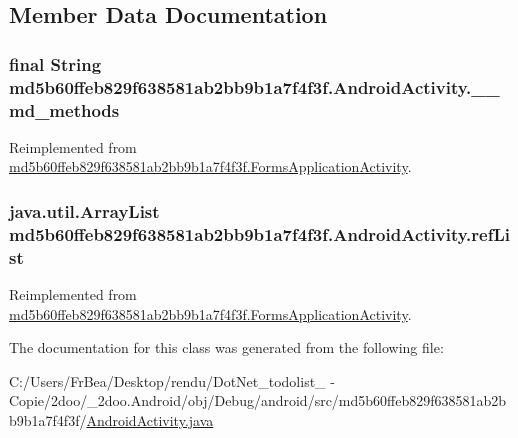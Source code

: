 \subsection{Member Data Documentation}
\hypertarget{classmd5b60ffeb829f638581ab2bb9b1a7f4f3f_1_1_android_activity_96cef65bd666995b23bcd03497dea337}{
\subsubsection[{\_\-\_\-md\_\-methods}]{\setlength{\rightskip}{0pt plus 5cm}final String {\bf md5b60ffeb829f638581ab2bb9b1a7f4f3f.AndroidActivity.\_\-\_\-md\_\-methods}}}
\label{classmd5b60ffeb829f638581ab2bb9b1a7f4f3f_1_1_android_activity_96cef65bd666995b23bcd03497dea337}




Reimplemented from \hyperlink{classmd5b60ffeb829f638581ab2bb9b1a7f4f3f_1_1_forms_application_activity_37d533299315e969b66527bb86dba664}{md5b60ffeb829f638581ab2bb9b1a7f4f3f.FormsApplicationActivity}.\hypertarget{classmd5b60ffeb829f638581ab2bb9b1a7f4f3f_1_1_android_activity_5c1d60bfbc05ceae734119d4d979b8cc}{
\subsubsection[{refList}]{\setlength{\rightskip}{0pt plus 5cm}java.util.ArrayList {\bf md5b60ffeb829f638581ab2bb9b1a7f4f3f.AndroidActivity.refList}}}
\label{classmd5b60ffeb829f638581ab2bb9b1a7f4f3f_1_1_android_activity_5c1d60bfbc05ceae734119d4d979b8cc}




Reimplemented from \hyperlink{classmd5b60ffeb829f638581ab2bb9b1a7f4f3f_1_1_forms_application_activity_b244a537e01278d3ee4186b6bceb6755}{md5b60ffeb829f638581ab2bb9b1a7f4f3f.FormsApplicationActivity}.

The documentation for this class was generated from the following file:\begin{CompactItemize}
\item 
C:/Users/FrBea/Desktop/rendu/DotNet\_\-todolist\_ - Copie/2doo/\_\-2doo.Android/obj/Debug/android/src/md5b60ffeb829f638581ab2bb9b1a7f4f3f/\hyperlink{_android_activity_8java}{AndroidActivity.java}\end{CompactItemize}
